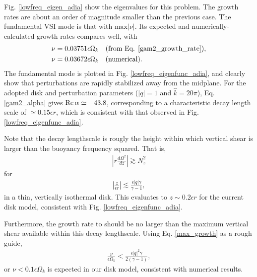 Fig. \ref{lowfreq_eigen_adia} show the eigenvalues for this
problem. The growth rates are about an order of magnitude smaller than
the previous case. The fundamental VSI mode is that with
$\mathrm{max}|\nu|$. Its expected and numerically-calculated growth
rates compares well, with 
\begin{align*}
  \nu = 0.03751 \epsilon \Omega_k &\quad \text{(from
    Eq. \ref{gam2_growth_rate})},\\
  \nu = 0.03672 \epsilon \Omega_k &\quad \text{(numerical)}.
\end{align*}
The fundamental mode is plotted in Fig. \ref{lowfreq_eigenfunc_adia},
and clearly show that perturbations are rapidly stabilized away from
the midplane. For the adopted disk and perturbation parameters 
($|q|=1$ and $\hat{k} = 20\pi$), Eq. \ref{gam2_alpha} gives $\operatorname{Re}{\alpha}\simeq - 43.8$,
corresponding to a characteristic decay length scale of $\simeq
0.15\epsilon r$, which is consistent with that observed in 
Fig. \ref{lowfreq_eigenfunc_adia}. 

Note that the decay lengthscale is rougly the height within which
vertical shear is larger than the buoyancy frequency squared. That is,
\begin{align*}
\left|r\frac{d\Omega^2}{dz}\right|\gtrsim N_z^2
\end{align*}
for
\begin{align*}
  \left|\frac{z}{\epsilon r}\right| \lesssim \frac{\epsilon|q|\gamma}{\gamma-1},
\end{align*}
in a thin, vertically isothermal disk. This evaluates to $z\sim
0.2\epsilon r$ for the current disk model, consistent with
Fig. \ref{lowfreq_eigenfunc_adia}. 

Furthermore, the growth rate to should be no larger than the
maximum vertical shear available within this decay lengthscale. Using 
Eq. \ref{max_growth} as a rough guide, 
\begin{align}
  \frac{\nu}{\epsilon\Omega_k}<\frac{\epsilon |q|^2\gamma}{2(\gamma-1)},
\end{align}
or $\nu< 0.1\epsilon\Omega_k$ is expected in our disk model,
consistent with numerical results. 


